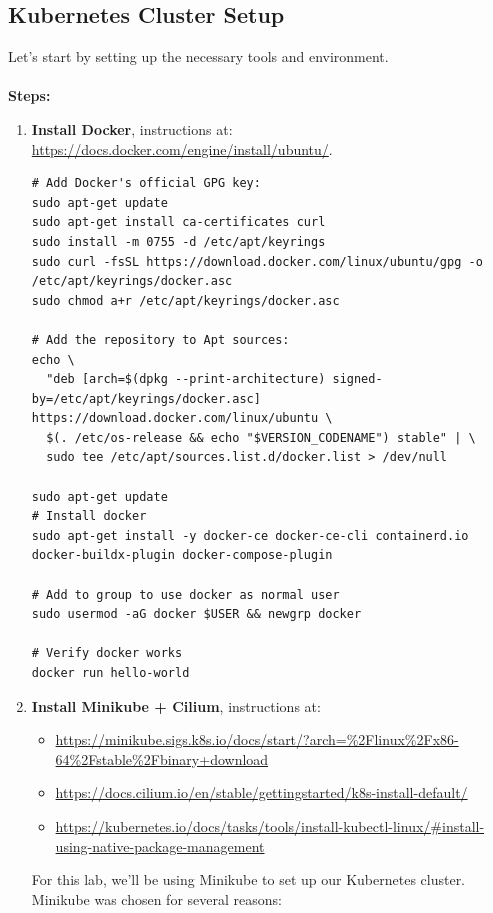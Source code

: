 \documentclass{article}
\begin{document}
\subsection{Kubernetes Cluster Setup}
Let's start by setting up the necessary tools and environment. 
\\\\
  \textbf{Steps:}
  \begin{enumerate}
      \item \textbf{Install Docker}, instructions at: \footnotesize\url{https://docs.docker.com/engine/install/ubuntu/}.
      \begin{lstlisting}
# Add Docker's official GPG key:
sudo apt-get update
sudo apt-get install ca-certificates curl
sudo install -m 0755 -d /etc/apt/keyrings
sudo curl -fsSL https://download.docker.com/linux/ubuntu/gpg -o /etc/apt/keyrings/docker.asc
sudo chmod a+r /etc/apt/keyrings/docker.asc

# Add the repository to Apt sources:
echo \
  "deb [arch=$(dpkg --print-architecture) signed-by=/etc/apt/keyrings/docker.asc] https://download.docker.com/linux/ubuntu \
  $(. /etc/os-release && echo "$VERSION_CODENAME") stable" | \
  sudo tee /etc/apt/sources.list.d/docker.list > /dev/null

sudo apt-get update
# Install docker
sudo apt-get install -y docker-ce docker-ce-cli containerd.io docker-buildx-plugin docker-compose-plugin

# Add to group to use docker as normal user
sudo usermod -aG docker $USER && newgrp docker

# Verify docker works
docker run hello-world
      \end{lstlisting}
      \normalsize
      \item \textbf{Install Minikube + Cilium}, instructions at:
    \begin{itemize}
        \item \footnotesize\url{https://minikube.sigs.k8s.io/docs/start/?arch=%2Flinux%2Fx86-64%2Fstable%2Fbinary+download}
        \item \footnotesize\url{https://docs.cilium.io/en/stable/gettingstarted/k8s-install-default/}
        \item \footnotesize\url{https://kubernetes.io/docs/tasks/tools/install-kubectl-linux/#install-using-native-package-management}
    \end{itemize}
    For this lab, we'll be using Minikube to set up our Kubernetes cluster. Minikube was chosen for several reasons:


\end{enumerate}
\end{document}

